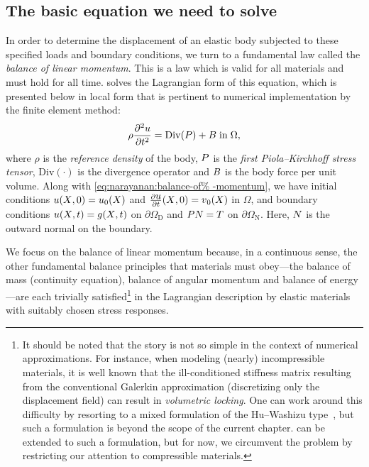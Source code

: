 \subsection{The basic equation we need to solve}

In order to determine the displacement of an elastic body subjected to
these specified loads and boundary conditions, we turn to a
fundamental law called the {\em balance of linear momentum}. This is a
law which is valid for all materials and must hold for all
time. \twist{} solves the Lagrangian form of this equation, which is
presented below in local form that is pertinent to numerical
implementation by the finite element method:
\begin{equation}
  \rho \frac{\partial^{2} \mbox{$ u$}}{\partial t^{2}} = \mathrm{Div}(\mbox{$ P$})
  + \mbox{$ B$}\; \mathrm{in}\; \Omega,
  \label{eq:narayanan:balance-of-momentum}
\end{equation}
where $\rho$ is the {\em reference density} of the body,
$\mbox{$ P$}$ is the {\em first Piola--Kirchhoff stress tensor}, $\mathrm{Div}
(\cdot)$ is the divergence operator and $\mbox{$ B$}$ is the body force per
unit volume. Along with \eqref{eq:narayanan:balance-of%
-momentum}, we have initial conditions $\mbox{$ u$}(\mbox{$ X$}, 0) = \mbox{$ u$}_{0}(\mbox{$ X$})$
and $\frac{\partial\mbox{$ u$}}{\partial t}(\mbox{$ X$}, 0) = \mbox{$ v$}_{0}(\mbox{$ X$})$ in
$\Omega$, and boundary conditions $\mbox{$ u$}(\mbox{$ X$}, t) = \mbox{$ g$}(\mbox{$ X$}, t)$ on
$\partial\Omega_{\mathrm{D}}$ and $\mbox{$ P$} \mbox{$ N$} = \mbox{$ T$}$ on
$\partial\Omega_{\mathrm{N}}$. Here, $\mbox{$ N$}$ is the outward normal
on the boundary.

We focus on the balance of linear momentum because, in a continuous
sense, the other fundamental balance principles that materials must
obey---the balance of mass (continuity equation), balance of angular
momentum and balance of energy---are each trivially
satisfied\footnote{It should be noted that the story is not
  so simple in the context of numerical approximations. For instance,
  when modeling (nearly) incompressible materials, it is well known
  that the ill-conditioned stiffness matrix resulting from the
  conventional Galerkin approximation (discretizing only the
  displacement field) can result in {\em volumetric locking}. One can
  work around this difficulty by resorting to a mixed formulation of
  the Hu--Washizu type~\citep{SimoHughes1998}, but such a formulation
  is beyond the scope of the current chapter. \twist{} can be extended
  to such a formulation, but for now, we circumvent the problem by
  restricting our attention to compressible materials.} in the
Lagrangian description by elastic materials with suitably chosen
stress responses.


